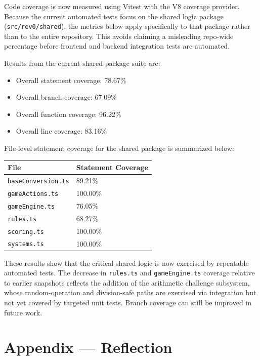 \documentclass[12pt, titlepage]{article}
\begin{document}
    Code coverage is now measured using Vitest with the V8 coverage provider.
    Because the current automated tests focus on the shared logic package
    (\texttt{src/rev0/shared}), the metrics below apply specifically to that
    package rather than to the entire repository. This avoids claiming a
    misleading repo-wide percentage before frontend and backend integration tests
    are automated.

    Results from the current shared-package suite are:

    \begin{itemize}
        \item Overall statement coverage: 78.67\%
        \item Overall branch coverage: 67.09\%
        \item Overall function coverage: 96.22\%
        \item Overall line coverage: 83.16\%
    \end{itemize}

    File-level statement coverage for the shared package is summarized below:

    \begin{small}
    \begin{tabular}{l l}
        \toprule
        File & Statement Coverage \\
        \midrule
        \texttt{baseConversion.ts} & 89.21\% \\
        \texttt{gameActions.ts} & 100.00\% \\
        \texttt{gameEngine.ts} & 76.05\% \\
        \texttt{rules.ts} & 68.27\% \\
        \texttt{scoring.ts} & 100.00\% \\
        \texttt{systems.ts} & 100.00\% \\
        \bottomrule
    \end{tabular}
    \end{small}

    These results show that the critical shared logic is now exercised by
    repeatable automated tests. The decrease in \texttt{rules.ts} and
    \texttt{gameEngine.ts} coverage relative to earlier snapshots reflects the
    addition of the arithmetic challenge subsystem, whose random-operation and
    division-safe paths are exercised via integration but not yet covered by
    targeted unit tests. Branch coverage can still be improved in future work.

    \newpage{}
    \section*{Appendix --- Reflection}
\end{document}
